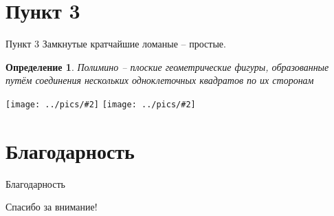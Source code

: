 \documentclass[serif, ucs]{beamer}
\newtheorem{Def}{Определение}[section]
\newcommand{\gr}[2]{\texttt{[image: ../pics/\#2]}}
\begin{document}
\section{Пункт 3}
\begin{frame}{Пункт 3}
	Замкнутые кратчайшие ломаные -- простые.
	
	\begin{Def}
	Полимино -- плоские геометрические фигуры, образованные путём соединения нескольких одноклеточных квадратов по их сторонам
\end{Def}

\gr{0.4}{aabAbABB}
\gr{0.4}{aaabbbAAABBB}
\end{frame}
\section{Благодарность}
\begin{frame}{Благодарность}
\begin{center}
{\LARGE Спасибо за внимание!}
\end{center}
\end{frame}
\end{document}
